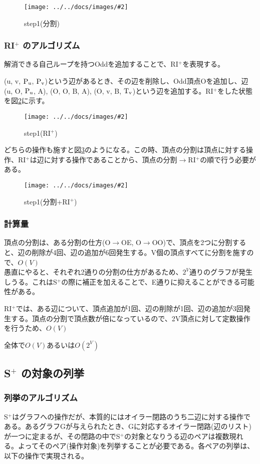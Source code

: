 \documentclass[11pt,a4j]{jarticle}
\newcommand{\splus}{S${}^\text{+}$}
\newcommand{\riplus}{RI${}^\text{+}$}
\newcommand{\f}[1]{$\rm{#1}$} %
\newcommand{\image}[4][height=100pt]{%
\begin{figure}[htbp]
    \centering
    \texttt{[image: ../../docs/images/\#2]}
    \caption{#3}
    \label{fig:#4}
\end{figure}%
}
\newcommand{\ra }{$\rightarrow$}
\newcommand{\tops}[2]{\texorpdfstring{#1}{#2}} %
\begin{document}
\image{extend_split.jpg}{step1(分割)}{split}

\subsubsection{\tops{\riplus}{RI+} のアルゴリズム}
解消できる自己ループを持つOddを追加することで、\riplus を表現する。

(u, v, \f{P_u}, \f{P_v})という辺があるとき、その辺を削除し、Odd頂点Oを追加し、辺(u, O, \f{P_u}, A), (O, O, B, A), (O, v, B, \f{T_v})という辺を追加する。\riplus をした状態を図\ref{fig:riplus}に示す。

\image{extend_riplus.jpg}{step1(\riplus )}{riplus}

どちらの操作も施すと図\ref{fig:total}のようになる。この時、頂点の分割は頂点に対する操作、\riplus は辺に対する操作であることから、頂点の分割\ra \riplus の順で行う必要がある。
\image{extend_total.jpg}{step1(分割+\riplus )}{total}

\subsubsection{計算量}
頂点の分割は、ある分割の仕方(O\ra OE, O\ra OO)で、頂点を2つに分割すると、辺の削除が4回、辺の追加が6回発生する。V個の頂点すべてに分割を施すので、$O(V)$\\
愚直にやると、それぞれ2通りの分割の仕方があるため、$2^V$通りのグラフが発生しうる。これは\splus の際に補正を加えることで、E通りに抑えることができる可能性がある。

\riplus では、ある辺について、頂点追加が1回、辺の削除が1回、辺の追加が3回発生する。頂点の分割で頂点数が倍になっているので、2V頂点に対して定数操作を行うため、$O(V)$

全体で$O(V)$あるいは$O(2^V)$

\subsection{\tops{\splus}{S+} の対象の列挙}
\label{enum}
\subsubsection{列挙のアルゴリズム}
\splus はグラフへの操作だが、本質的にはオイラー閉路のうち二辺に対する操作である。あるグラフGが与えられたとき、Gに対応するオイラー閉路(辺のリスト)が一つに定まるが、その閉路の中で\splus の対象となりうる辺のペアは複数現れる。よってそのペア(操作対象)を列挙することが必要である。各ペアの列挙は、以下の操作で実現される。
\end{document}
